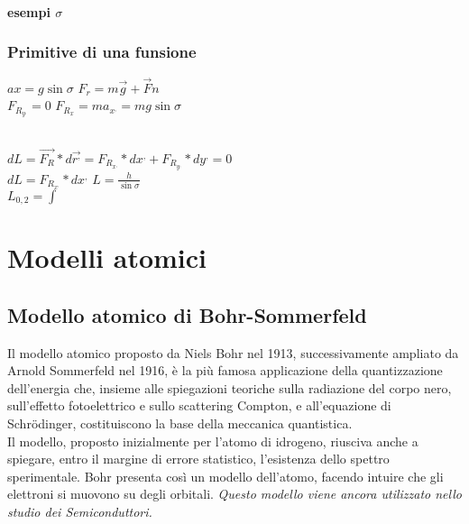 \documentclass{book}
\begin{document}
\subsubsection{esempi $\sigma$}
\subsection{Primitive di una funsione}
$ax=g\sin{\sigma}$ $F_r=m\overrightarrow{g}+\overrightarrow{F}n$\\
$F_{R_{y^,}}=0$ $F_{R_{x}}=ma_{x^,}=mg\sin\sigma$\\
\\
$dL=\overrightarrow{F_R}*d\overrightarrow{r^,}=F_{R_{x^,}}*dx^,+F_{R_{y^,}}*dy^,=0$\\
$dL=F_{R_{x^,}}*dx^,$ $L=\frac{h}{\sin\sigma}$\\
$L_{0,2}=\int$
\chapter{Modelli atomici}
\section{Modello atomico di Bohr-Sommerfeld}
Il modello atomico proposto da Niels Bohr nel 1913, successivamente ampliato da Arnold Sommerfeld nel 1916, è la più famosa applicazione della quantizzazione dell'energia che, insieme alle spiegazioni teoriche sulla radiazione del corpo nero, sull'effetto fotoelettrico e sullo scattering Compton, e all'equazione di Schrödinger, costituiscono la base della meccanica quantistica.\\
Il modello, proposto inizialmente per l'atomo di idrogeno, riusciva anche a spiegare, entro il margine di errore statistico, l'esistenza dello spettro sperimentale. Bohr presenta così un modello dell'atomo, facendo intuire che gli elettroni si muovono su degli orbitali. \textit{Questo modello viene ancora utilizzato nello studio dei Semiconduttori.} 
\begin{center}

\end{center}
\end{document}
